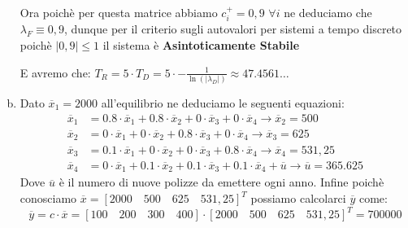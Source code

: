 \documentclass[a4paper]{report}
\begin{document}
\begin{enumerate}[a)]
Ora poichè per questa matrice abbiamo $c_i^+ =0,9$  $\forall i$ ne deduciamo che $\lambda_F \equiv 0,9$, dunque per il criterio sugli autovalori per sistemi a tempo discreto poichè $|0,9|\leq 1$ il sistema è \textbf{Asintoticamente Stabile}
\smallskip

E avremo che: $T_R=5\cdot T_D=5\cdot -\frac{1}{\ln(|\lambda_D|)}\approx 47.4561\dots$

\item Dato $\overline{x}_1=2000$ all'equilibrio ne deduciamo le seguenti equazioni:
\begin{align*}
\overline{x}_1&=0.8\cdot \overline{x}_1+0.8\cdot \overline{x}_2+ 0\cdot \overline{x}_3+0\cdot \overline{x}_4\longrightarrow\overline{x}_2=500 \\
\overline{x}_2&=0\cdot  \overline{x}_1+0\cdot  \overline{x}_2+ 0.8\cdot  \overline{x}_3+0\cdot  \overline{x}_4\longrightarrow\overline{x}_3=625 \\
\overline{x}_3&=0.1\cdot \overline{x}_1+0\cdot \overline{x}_2+ 0\cdot \overline{x}_3+0.8\cdot \overline{x}_4\longrightarrow\overline{x}_4=531,25 \\
\overline{x}_4&=0\cdot \overline{x}_1+0.1\cdot \overline{x}_2+ 0.1\cdot \overline{x}_3+0.1\cdot \overline{x}_4+\overline{u}\longrightarrow\overline{u}=365.625
\end{align*}
Dove $\overline{u}$ è il numero di nuove polizze da emettere ogni anno. Infine poichè conosciamo $\overline{x}=[ 2000\quad500\quad 625\quad 531,25]^T$ possiamo calcolarci $\overline{y}$ come:
\[
\overline{y}=c\cdot \overline{x}=[100\quad 200 \quad 300\quad400 ]\cdot [ 2000\quad500\quad 625\quad 531,25]^T=700 000 
\]
\end{enumerate}
\newpage 
\end{document}
